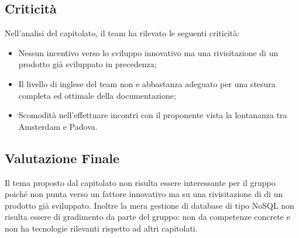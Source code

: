 \subsection{Criticità}
Nell'analisi del capitolato, il team ha rilevato le seguenti criticità:
\begin{itemize}
	\item Nessun incentivo verso lo sviluppo innovativo ma una rivisitazione di un prodotto già sviluppato in precedenza; 
	\item Il livello di inglese del team non e abbastanza adeguato per una stesura completa ed ottimale della documentazione; 	
	\item Scomodità nell'effettuare incontri con il proponente vista la lontananza tra Amsterdam e Padova.
\end{itemize}

\subsection{Valutazione Finale}
Il tema proposto dal capitolato non risulta essere interessante per il gruppo poiché non punta verso un fattore innovativo ma su una rivisitazione di di un prodotto già sviluppato.
Inoltre la mera gestione di database di tipo NoSQL non risulta essere di gradimento da parte del gruppo: non da competenze concrete e non ha tecnologie rilevanti rispetto ad altri capitolati. 


